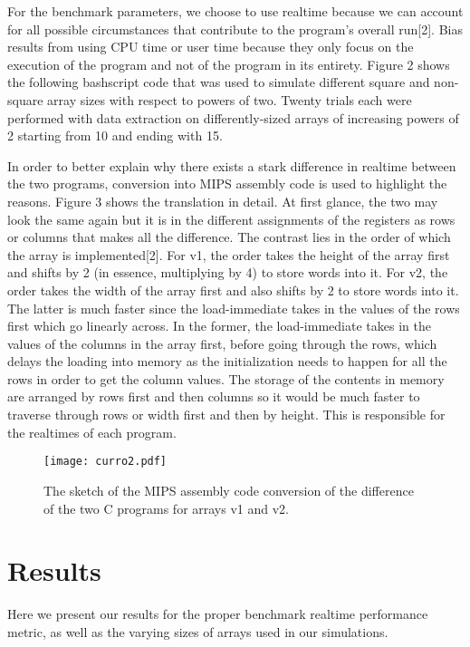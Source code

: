 \documentclass[a4paper]{article}
\begin{document}
For the benchmark parameters, we choose to use realtime because we can account for all possible circumstances that contribute to the program’s overall run[2]. Bias results from using CPU time or user time because they only focus on the execution of the program and not of the program in its entirety. Figure 2 shows the following bashscript code that was used to simulate different square and non-square array sizes with respect to powers of two. Twenty trials each were performed with data extraction on differently-sized arrays of increasing powers of 2 starting from 10 and ending with 15. 

In order to better explain why there exists a stark difference in realtime between the two programs, conversion into MIPS assembly code is used to highlight the reasons. Figure 3 shows the translation in detail. At first glance, the two may look the same again but it is in the different assignments of the registers as rows or columns that makes all the difference. The contrast lies in the order of which the array is implemented[2]. For v1, the order takes the height of the array first and shifts by 2 (in essence, multiplying by 4) to store words into it. For v2, the order takes the width of the array first and also shifts by 2 to store words into it. The latter is much faster since the load-immediate takes in the values of the rows first which go linearly across. In the former, the load-immediate takes in the values of the columns in the array first, before going through the rows, which delays the loading into memory as the initialization needs to happen for all the rows in order to get the column values. The storage of the contents in memory are arranged by rows first and then columns so it would be much faster to traverse through rows or width first and then by height. This is responsible for the realtimes of each program. 

\begin{figure}[H]
\centering
\texttt{[image: curro2.pdf]}
\caption{\label{fig:bashscript}The sketch of the MIPS assembly code conversion of the difference of the two C programs for arrays v1 and v2.}
\end{figure}

\section{Results}
Here we present our results for the proper benchmark realtime performance metric, as well as the varying sizes of arrays used in our simulations.
\end{document}
